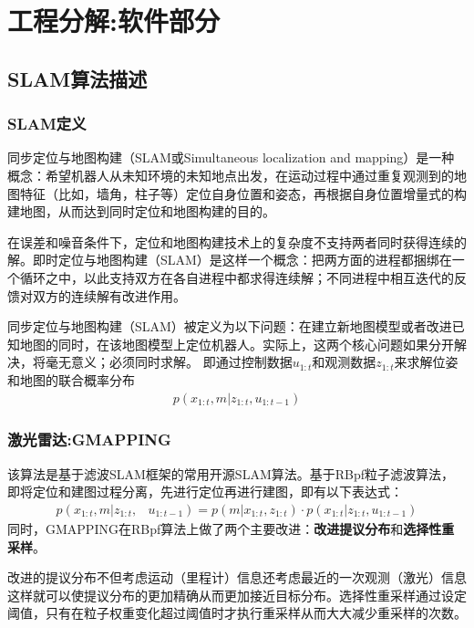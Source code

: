 \documentclass[cs4size,a4paper]{ctexart}
\numberwithin{equation}{section}
\numberwithin{table}{section}
\numberwithin{figure}{section}
\begin{document}
\section{工程分解:软件部分}
\subsection{SLAM算法描述}
\subsubsection{SLAM定义}
同步定位与地图构建（SLAM或Simultaneous localization and mapping）是一种概念：希望机器人从未知环境的未知地点出发，在运动过程中通过重复观测到的地图特征（比如，墙角，柱子等）定位自身位置和姿态，再根据自身位置增量式的构建地图，从而达到同时定位和地图构建的目的。

在误差和噪音条件下，定位和地图构建技术上的复杂度不支持两者同时获得连续的解。即时定位与地图构建（SLAM）是这样一个概念：把两方面的进程都捆绑在一个循环之中，以此支持双方在各自进程中都求得连续解；不同进程中相互迭代的反馈对双方的连续解有改进作用。

同步定位与地图构建（SLAM）被定义为以下问题：在建立新地图模型或者改进已知地图的同时，在该地图模型上定位机器人。实际上，这两个核心问题如果分开解决，将毫无意义；必须同时求解。
即通过控制数据$u_{1:t}$和观测数据$z_{1:t}$来求解位姿和地图的联合概率分布
\begin{align}
    p\left(x_{1: t}, m | z_{1: t}, u_{1: t-1}\right)
\end{align}
\subsubsection{激光雷达:GMAPPING}
该算法\cite{1570477}是基于滤波SLAM框架的常用开源SLAM算法。基于RBpf粒子滤波算法，即将定位和建图过程分离，先进行定位再进行建图，即有以下表达式：
\begin{align}
    p\left(x_{1: t}, m | z_{1: t},\right.&\left.u_{1: t-1}\right) =p\left(m | x_{1: t}, z_{1: t}\right) \cdot p\left(x_{1: t} | z_{1: t}, u_{1: t-1}\right)
\end{align}
同时，GMAPPING在RBpf算法上做了两个主要改进：\textbf{改进提议分布}和\textbf{选择性重采样}。

改进的提议分布不但考虑运动（里程计）信息还考虑最近的一次观测（激光）信息这样就可以使提议分布的更加精确从而更加接近目标分布。选择性重采样通过设定阈值，只有在粒子权重变化超过阈值时才执行重采样从而大大减少重采样的次数。
\end{document}
